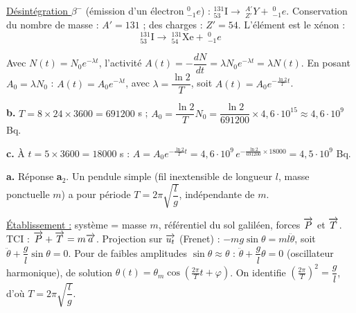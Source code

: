 \documentclass[11pt]{article}
\begin{document}
 \underline{Désintégration $\beta^-$} (émission d'un électron $^{0}_{-1}e$) : $^{131}_{53}\text{I} \longrightarrow\ ^{A'}_{Z'}Y +\ ^{0}_{-1}e$. Conservation du nombre de masse : $A' = 131$ ; des charges : $Z' = 54$. L'élément est le xénon :
\[ ^{131}_{53}\text{I} \longrightarrow\ ^{131}_{54}\text{Xe} +\ ^{0}_{-1}e \]

 Avec $N(t) = N_0 e^{-\lambda t}$, l'activité $A(t) = -\dfrac{dN}{dt} = \lambda N_0 e^{-\lambda t} = \lambda N(t)$. En posant $A_0 = \lambda N_0$ : $A(t) = A_0 e^{-\lambda t}$, avec $\lambda = \dfrac{\ln 2}{T}$, soit $A(t) = A_0 e^{-\frac{\ln 2}{T}t}$.

\textbf{b.} $T = 8\times 24\times 3600 = 691200$ s ; $A_0 = \dfrac{\ln 2}{T}N_0 = \dfrac{\ln 2}{691200}\times 4{,}6\cdot10^{15} \approx 4{,}6\cdot10^{9}$ Bq.

\textbf{c.} À $t = 5\times 3600 = 18000$ s : $A = A_0 e^{-\frac{\ln 2}{T}t} = 4{,}6\cdot10^{9}\,e^{-\frac{\ln 2}{691200}\times 18000} = 4{,}5\cdot10^{9}$ Bq.


\textbf{a. } Réponse \textbf{a$_2$}. Un pendule simple (fil inextensible de longueur $l$, masse ponctuelle $m$) a pour période $T = 2\pi\sqrt{\dfrac{l}{g}}$, indépendante de $m$.
\begin{center}
\end{center}
\underline{Établissement :} système = masse $m$, référentiel du sol galiléen, forces $\overrightarrow{P}$ et $\overrightarrow{T}$. TCI : $\overrightarrow{P} + \overrightarrow{T} = m\overrightarrow{a}$. Projection sur $\overrightarrow{u_t}$ (Frenet) : $-mg\sin\theta = ml\ddot{\theta}$, soit $\ddot{\theta} + \dfrac{g}{l}\sin\theta = 0$. Pour de faibles amplitudes $\sin\theta \approx \theta$ : $\ddot{\theta} + \dfrac{g}{l}\theta = 0$ (oscillateur harmonique), de solution $\theta(t) = \theta_m\cos\left(\frac{2\pi}{T}t + \varphi\right)$. On identifie $\left(\frac{2\pi}{T}\right)^2 = \dfrac{g}{l}$, d'où $T = 2\pi\sqrt{\dfrac{l}{g}}$.
\end{document}
